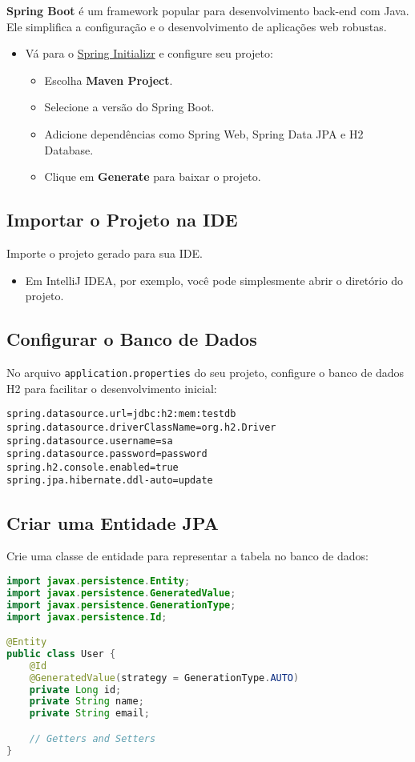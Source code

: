 \documentclass[a4paper,12pt]{book}
\begin{document}
\textbf{Spring Boot} é um framework popular para desenvolvimento back-end com Java. Ele simplifica a configuração e o desenvolvimento de aplicações web robustas.
\begin{itemize}
    \item Vá para o \href{https://start.spring.io/}{Spring Initializr} e configure seu projeto:
    \begin{itemize}
        \item Escolha \textbf{Maven Project}.
        \item Selecione a versão do Spring Boot.
        \item Adicione dependências como Spring Web, Spring Data JPA e H2 Database.
        \item Clique em \textbf{Generate} para baixar o projeto.
    \end{itemize}
\end{itemize}

\subsection{Importar o Projeto na IDE}

Importe o projeto gerado para sua IDE.
\begin{itemize}
    \item Em IntelliJ IDEA, por exemplo, você pode simplesmente abrir o diretório do projeto.
\end{itemize}

\subsection{Configurar o Banco de Dados}

No arquivo \texttt{application.properties} do seu projeto, configure o banco de dados H2 para facilitar o desenvolvimento inicial:
\begin{lstlisting}[language=SpringBoot]
spring.datasource.url=jdbc:h2:mem:testdb
spring.datasource.driverClassName=org.h2.Driver
spring.datasource.username=sa
spring.datasource.password=password
spring.h2.console.enabled=true
spring.jpa.hibernate.ddl-auto=update
\end{lstlisting}

\subsection{Criar uma Entidade JPA}

Crie uma classe de entidade para representar a tabela no banco de dados:
\begin{lstlisting}[language=java]
import javax.persistence.Entity;
import javax.persistence.GeneratedValue;
import javax.persistence.GenerationType;
import javax.persistence.Id;

@Entity
public class User {
    @Id
    @GeneratedValue(strategy = GenerationType.AUTO)
    private Long id;
    private String name;
    private String email;

    // Getters and Setters
}
\end{lstlisting}
\end{document}
